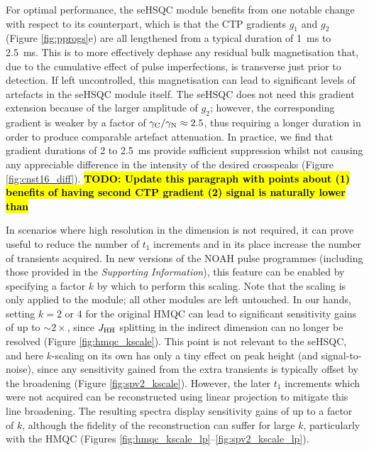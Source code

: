 \documentclass[11pt]{article}
\newcommand*{\carbon}{\ce{^{13}C}}
\newcommand*{\nitrogen}{\ce{^{15}N}}
\newcommand*{\jhh}{J_{\ce{HH}}}
\newcommand*{\figref}[1]{Figure \ref{fig:#1}}
\newcommand*{\SInf}{\textit{Supporting Information}}
\begin{document}
For optimal performance, the \nitrogen{} seHSQC module benefits from one notable change with respect to its \carbon{} counterpart, which is that the CTP gradients $g_1$ and $g_2$ (\figref{pprogs}e) are all lengthened from a typical duration of \SI{1}{\ms} to \SI{2.5}{\ms}.
This is to more effectively dephase any residual bulk magnetisation that, due to the cumulative effect of pulse imperfections, is transverse just prior to detection.
If left uncontrolled, this magnetisation can lead to significant levels of artefacts in the seHSQC module itself.
The \carbon{} seHSQC does not need this gradient extension because of the larger amplitude of $g_2$; however, the corresponding \nitrogen{} gradient is weaker by a factor of $\gamma_{\ce{C}}/\gamma_{\ce{N}} \approx 2.5$, thus requiring a longer duration in order to produce comparable artefact attenuation.
In practice, we find that gradient durations of 2 to \SI{2.5}{\ms} provide sufficient suppression whilst not causing any appreciable difference in the intensity of the desired crosspeaks (\figref{cnst16_diff}).
\hl{\textbf{TODO: Update this paragraph with points about (1) benefits of having second CTP gradient (2) \nitrogen{} signal is naturally lower than \carbon{}}}

In scenarios where high resolution in the \nitrogen{} dimension is not required, it can prove useful to reduce the number of $t_1$ increments and in its place increase the number of transients acquired.\autocite{Perez-Trujillo2007MRC, Parella2010CMR}
In new versions of the NOAH pulse programmes (including those provided in the \SInf{}), this feature can be enabled by specifying a factor $k$ by which to perform this scaling.
Note that the scaling is only applied to the \nitrogen{} module; all other modules are left untouched.
In our hands, setting $k = 2$ or 4 for the original \nitrogen{} HMQC can lead to significant sensitivity gains of up to $\sim 2\times$, since $\jhh$ splitting in the indirect dimension can no longer be resolved (\figref{hmqc_kscale}).
This point is not relevant to the seHSQC, and here $k$-scaling on its own has only a tiny effect on peak height (and signal-to-noise), since any sensitivity gained from the extra transients is typically offset by the broadening (\figref{spv2_kscale}).
However, the later $t_1$ increments which were not acquired can be reconstructed using linear projection\autocite{linearpred} to mitigate this line broadening.
The resulting spectra display sensitivity gains of up to a factor of $k$, although the fidelity of the reconstruction can suffer for large $k$, particularly with the HMQC (Figures \ref{fig:hmqc_kscale_lp}--\ref{fig:spv2_kscale_lp}).
\end{document}
